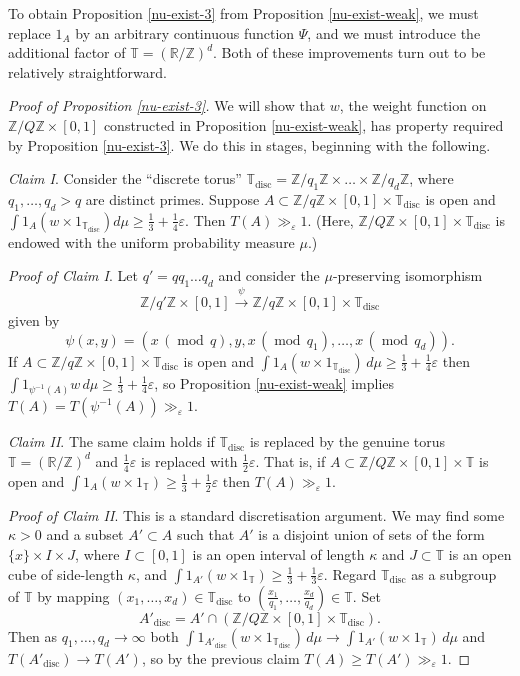 \documentclass[10pt,reqno]{amsart}
\theoremstyle{definition}
\theoremstyle{remark}
\newcommand{\md}[1]{\ensuremath{\,(\operatorname{mod}\, #1)}}
\renewcommand{\geq}{\geqslant}
\newcommand\disc{\operatorname{disc}}
\def\R{\mathbb{R}}
\def\Z{\mathbb{Z}}
\def\T{\mathbb{T}}
\def\eps{\varepsilon}
\numberwithin{equation}{section}
\begin{document}
To obtain Proposition \ref{nu-exist-3} from Proposition \ref{nu-exist-weak}, we must replace $1_A$ by an arbitrary continuous function $\Psi$, and we must introduce the additional factor of $\T = (\R/\Z)^d$. Both of these improvements turn out to be relatively straightforward.

\begin{proof}[Proof of Proposition \ref{nu-exist-3}]
We will show that $w$, the weight function on $\Z/Q\Z\times[0,1]$ constructed in Proposition \ref{nu-exist-weak}, has property required by Proposition \ref{nu-exist-3}. We do this in stages, beginning with the following.

\emph{Claim I}. Consider the ``discrete torus'' $\T_{\disc} = \Z/q_1 \Z \times \dots \times \Z/q_d \Z$, where $q_1,\dots, q_d > q$ are distinct primes. Suppose $A \subset \Z/q\Z \times [0,1] \times \T_{\disc}$ is open and $\int 1_A (w \times 1_{\T_{\disc}})d\mu \geq \frac{1}{3} + \frac{1}{4}\eps$. Then $T(A) \gg_{\eps} 1$. (Here, $\Z/Q\Z \times [0,1] \times \T_{\disc}$ is endowed with the uniform probability measure $\mu$.)

\emph{Proof of Claim I}. Let $q' = q q_1 \dots q_d$ and consider the $\mu$-preserving isomorphism \[\Z/q'\Z \times [0,1] \stackrel{\psi}{\longrightarrow} \Z/q\Z \times [0,1]  \times \T_{\disc}\] given by \[ \psi(x,y) = (x \md q, y, x\md{q_1}, \dots, x \md{q_d}).\] If $A\subset\Z/q\Z\times[0,1]\times\T_{\disc}$ is open and $\int 1_A (w \times 1_{\T_{\disc}})\,d\mu \geq \frac{1}{3} + \frac{1}{4}\eps$ then $\int 1_{\psi^{-1}(A)} w\,d\mu \geq \frac{1}{3} + \frac{1}{4}\eps$, so Proposition \ref{nu-exist-weak} implies $T(A) = T(\psi^{-1}(A))\gg_{\eps} 1$.

\emph{Claim II}. The same claim holds if $\T_{\disc}$ is replaced by the genuine torus $\T = (\R/\Z)^d$ and $\frac{1}{4}\eps$ is replaced with $\frac{1}{2}\eps$. That is, if $A \subset \Z/Q\Z\times [0,1] \times \T$ is open and $\int 1_A (w \times 1_{\T}) \geq \frac{1}{3} + \frac{1}{2}\eps$ then $T(A) \gg_{\eps} 1$.

\emph{Proof of Claim II}. This is a standard discretisation argument. We may find some $\kappa>0$ and a subset $A'\subset A$ such that $A'$ is a disjoint union of sets of the form $\{x\}\times I\times J$, where $I\subset[0,1]$ is an open interval of length $\kappa$ and $J\subset\T$ is an open cube of side-length $\kappa$, and $\int 1_{A'} (w\times 1_{\T}) \geq \frac{1}{3} + \frac{1}{3}\eps$. Regard $\T_{\disc}$ as a subgroup of $\T$ by mapping $(x_1,\dots, x_d) \in \T_{\disc}$ to $\left(\frac{x_1}{q_1}, \dots, \frac{x_d}{q_d}\right) \in \T$. Set \[A'_{\disc} = A' \cap (\Z/Q\Z\times[0,1]\times\T_{\disc}).\] Then as $q_1,\dots,q_d\to\infty$ both $\int 1_{A'_{\disc}}(w\times1_{\T_{\disc}})\,d\mu \to\int 1_{A'} (w\times1_{\T})\,d\mu$ and $T(A'_{\disc})\to T(A')$, so by the previous claim $T(A)\geq T(A')\gg_\eps 1$.


\end{proof}
\end{document}
